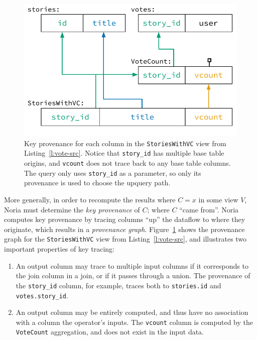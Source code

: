 \begin{figure}[t]
  \centering
  \includegraphics{diagrams/Key Provenance.pdf}
  \caption{Key provenance for each column in the \texttt{StoriesWithVC} view
  from Listing~\ref{l:vote-src}. Notice that \texttt{\color{set3}story\_id} has
  multiple base table origins, and \texttt{\color{set2}vcount} does not trace
  back to any base table columns. The query only uses
  \texttt{\color{set3}story\_id} as a parameter, so only its provenance is used
  to choose the upquery path.}
  \label{f:key-prov}
\end{figure}

More generally, in order to recompute the results where $C = x$ in some view
$V$, Noria must determine the \textit{key provenance} of $C$; where $C$ ``came
from''. Noria computes key provenance by tracing columns ``up'' the dataflow to
where they originate, which results in a \textit{provenance graph}.
Figure~\ref{f:key-prov} shows the provenance graph for the
\texttt{StoriesWithVC} view from Listing~\vref{l:vote-src}, and illustrates two
important properties of key tracing:

\begin{enumerate}
  \item An output column may trace to multiple input columns if it corresponds
    to the join column in a join, or if it passes through a union. The
    provenance of the \texttt{story\_id} column, for example, traces both to
    \texttt{stories.id} and \texttt{votes.story\_id}.
  \item An output column may be entirely computed, and thus have no association
    with a column the operator's inputs. The \texttt{vcount} column is computed
    by the \texttt{VoteCount} aggregation, and does not exist in the input data.
\end{enumerate}

